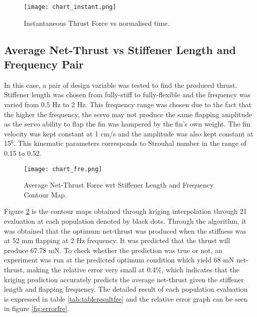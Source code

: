\label{sec:forceinstant}
\begin{figure}[H]
    \centering
    \texttt{[image: chart\_instant.png]}
    \caption{Instantaneous Thrust Force vs normalised time.}
    \label{fig:chartinstant}
\end{figure}
\subsection{Average Net-Thrust vs Stiffener Length and Frequency Pair}
In this case, a pair of design variable was tested to find the produced thrust. Stiffener length was chosen from fully-stiff to fully-flexible and the frequency was varied from 0.5 Hz to 2 Hz. This frequency range was chosen due to the fact that the higher the frequency, the servo may not produce the same flapping amplitude as the servo ability to flap the fin was hampered by the fin's own weight. The fin velocity was kept constant at 1 cm/s and the amplitude was also kept constant at 15$^{0}$. This kinematic parameters corresponds to Strouhal number in the range of 0.15 to 0.52.\par
\begin{figure}[H]
    \centering
    \texttt{[image: chart\_fre.png]}
    \caption{Average Net-Thrust Force wrt Stiffener Length and Frequency Contour Map.}
    \label{fig:chart_fre}
\end{figure}
Figure \ref{fig:chart_fre} is the contour maps obtained through kriging interpolation through 21 evaluation at each population denoted by black dots. Through the algorithm, it was obtained that the optimum net-thrust was produced when the stiffness was at 52 mm flapping at 2 Hz frequency. It was predicted that the thrust will produce 67.78 mN. To check whether the prediction was true or not, an experiment was run at the predicted optimum condition which yield 68 mN net-thrust, making the relative error very small at 0.4\%, which indicates that the kriging prediction accurately predicts the average net-thrust given the stiffener length and flapping frequency. The detailed result of each population evaluation is expressed in table \ref{tab:tableresultfre} and the relative error graph can be seen in figure \ref{fig:errorfre}.
